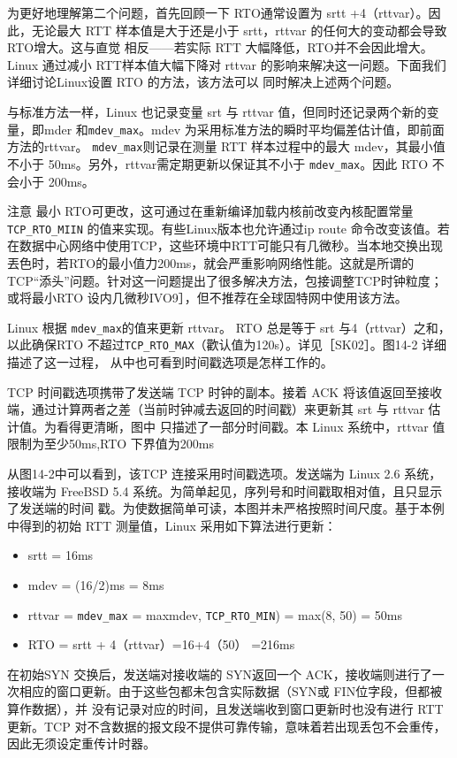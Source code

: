 为更好地理解第二个问题，首先回顾一下 RTO通常设置为 srtt +4（rttvar）。因此，无论最大 RTT 样本值是大于还是小于 srtt，rttvar 的任何大的变动都会导致 RTO增大。这与直觉
相反——若实际 RTT 大幅降低，RTO并不会因此增大。Linux 通过减小 RTT样本值大幅下降对 rttvar 的影响来解决这一问题。下面我们详细讨论Linux设置 RTO 的方法，该方法可以
同时解决上述两个问题。

与标准方法一样，Linux 也记录变量 srt 与 rttvar 值，但同时还记录两个新的变量，即mder 和\verb|mdev_max|。mdev 为采用标准方法的瞬时平均偏差估计值，即前面方法的rttvar。
\verb|mdev_max|则记录在测量 RTT 样本过程中的最大 mdev，其最小值不小于 50ms。另外，rttvar需定期更新以保证其不小于 \verb|mdev_max|。因此 RTO 不会小于 200ms。

注意 最小 RTO可更改，这可通过在重新编译加载内核前改变內核配置常量\verb|TCP_RTO_MIIN| 的值来实现。有些Linux版本也允许通过ip route 命令改变该值。若
在数据中心网络中使用TCP，这些环境中RTT可能只有几微秒。当本地交换出现丟色时，若RTO的最小值力200ms，就会严重影响网络性能。这就是所谓的
TCP“添头”问题。针对这一问题提出了很多解决方法，包接调整TCP时钟粒度；或将最小RTO 设内几微秒IVO9］，但不推荐在全球固特网中使用该方法。

Linux 根据 \verb|mdev_max|的值来更新 rttvar。 RTO 总是等于 srt 与4（rttvar）之和，以此确保RTO 不超过\verb|TCP_RTO_MAX|（歡认值为120s）。详见［SK02］。图14-2 详细描述了这一过程，
从中也可看到时间戳选项是怎样工作的。

TCP 时间戳选项携带了发送端 TCP 时钟的副本。接着 ACK 将该值返回至接收端，通过计算两者之差（当前时钟减去返回的时间戳）来更新其 srt 与 rttvar 估计值。为看得更清晰，图中
只描述了一部分时间戳。本 Linux 系统中，rttvar 值限制为至少50ms,RTO 下界值为200ms

从图14-2中可以看到，该TCP 连接采用时间戳选项。发送端为 Linux 2.6 系统，接收端为 FreeBSD 5.4 系统。为简单起见，序列号和时间戳取相对值，且只显示了发送端的时间
戳。为使数据简单可读，本图并未严格按照时间尺度。基于本例中得到的初始 RTT 测量值，Linux 采用如下算法进行更新：
\begin{itemize}
    \item srtt = 16ms
    \item mdev = (16/2)ms = 8ms
    \item rttvar = \verb|mdev_max| = maxmdev, \verb|TCP_RTO_MIN|) = max(8, 50) = 50ms
    \item RTO = srtt + 4（rttvar）=16+4（50） =216ms
\end{itemize}

在初始SYN 交换后，发送端对接收端的 SYN返回一个 ACK，接收端则进行了一次相应的窗口更新。由于这些包都未包含实际数据（SYN或 FIN位字段，但都被算作数据），并
没有记录对应的时间，且发送端收到窗口更新时也没有进行 RTT更新。TCP 对不含数据的报文段不提供可靠传输，意味着若出现丢包不会重传，因此无须设定重传计时器。


